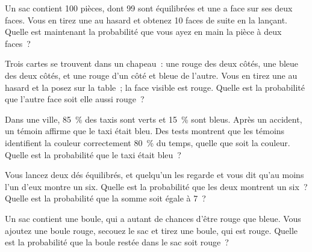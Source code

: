 \begin{question}\label{iq:iv1:conditional-probability-and-bayes:4}
Un sac contient 100 pièces, dont 99 sont équilibrées et une a face sur ses deux faces. Vous en tirez une au hasard et obtenez 10 faces de suite en la lançant. Quelle est maintenant la probabilité que vous ayez en main la pièce à deux faces~?
\end{question}

\begin{question}\label{iq:iv1:conditional-probability-and-bayes:5}
Trois cartes se trouvent dans un chapeau~: une rouge des deux côtés, une bleue des deux côtés, et une rouge d'un côté et bleue de l'autre. Vous en tirez une au hasard et la posez sur la table~; la face visible est rouge. Quelle est la probabilité que l'autre face soit elle aussi rouge~?
\end{question}

\begin{question}\label{iq:iv1:conditional-probability-and-bayes:6}
Dans une ville, 85~\% des taxis sont verts et 15~\% sont bleus. Après un accident, un témoin affirme que le taxi était bleu. Des tests montrent que les témoins identifient la couleur correctement 80~\% du temps, quelle que soit la couleur. Quelle est la probabilité que le taxi était bleu~?
\end{question}

\begin{question}\label{iq:iv1:conditional-probability-and-bayes:7}
Vous lancez deux dés équilibrés, et quelqu'un les regarde et vous dit qu'au moins l'un d'eux montre un six. Quelle est la probabilité que les deux montrent un six~? Quelle est la probabilité que la somme soit égale à 7~?
\end{question}

\begin{question}\label{iq:iv1:conditional-probability-and-bayes:8}
Un sac contient une boule, qui a autant de chances d'être rouge que bleue. Vous ajoutez une boule rouge, secouez le sac et tirez une boule, qui est rouge. Quelle est la probabilité que la boule restée dans le sac soit rouge~?
\end{question}


